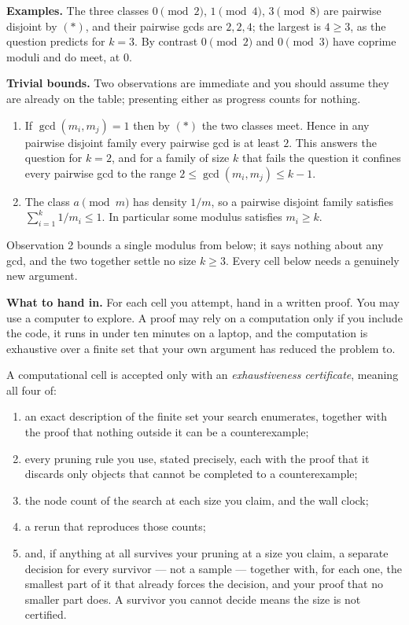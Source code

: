 \documentclass[11pt,a4paper]{article}
\providecommand{\tightlist}{\setlength{\itemsep}{0pt}\setlength{\parskip}{0pt}}
\begin{document}
\textbf{Examples.} The three classes \(0 \pmod 2\), \(1 \pmod 4\),
\(3 \pmod 8\) are pairwise disjoint by \((*)\), and their pairwise gcds
are \(2, 2, 4\); the largest is \(4 \ge 3\), as the question predicts
for \(k = 3\). By contrast \(0 \pmod 2\) and \(0 \pmod 3\) have coprime
moduli and do meet, at \(0\).

\textbf{Trivial bounds.} Two observations are immediate and you should
assume they are already on the table; presenting either as progress
counts for nothing.

\begin{enumerate}
\def\labelenumi{\arabic{enumi}.}
\tightlist
\item
  If \(\gcd(m_i, m_j) = 1\) then by \((*)\) the two classes meet. Hence
  in any pairwise disjoint family every pairwise gcd is at least \(2\).
  This answers the question for \(k = 2\), and for a family of size
  \(k\) that fails the question it confines every pairwise gcd to the
  range \(2 \le \gcd(m_i, m_j) \le k - 1\).
\item
  The class \(a \pmod m\) has density \(1/m\), so a pairwise disjoint
  family satisfies \(\sum_{i=1}^k 1/m_i \le 1\). In particular some
  modulus satisfies \(m_i \ge k\).
\end{enumerate}

Observation 2 bounds a single modulus from below; it says nothing about
any gcd, and the two together settle no size \(k \ge 3\). Every cell
below needs a genuinely new argument.

\textbf{What to hand in.} For each cell you attempt, hand in a written
proof. You may use a computer to explore. A proof may rely on a
computation only if you include the code, it runs in under ten minutes
on a laptop, and the computation is exhaustive over a finite set that
your own argument has reduced the problem to.

A computational cell is accepted only with an \emph{exhaustiveness
certificate}, meaning all four of:

\begin{enumerate}
\def\labelenumi{\arabic{enumi}.}
\tightlist
\item
  an exact description of the finite set your search enumerates,
  together with the proof that nothing outside it can be a
  counterexample;
\item
  every pruning rule you use, stated precisely, each with the proof that
  it discards only objects that cannot be completed to a counterexample;
\item
  the node count of the search at each size you claim, and the wall
  clock;
\item
  a rerun that reproduces those counts;
\item
  and, if anything at all survives your pruning at a size you claim, a
  separate decision for every survivor --- not a sample --- together
  with, for each one, the smallest part of it that already forces the
  decision, and your proof that no smaller part does. A survivor you
  cannot decide means the size is not certified.
\end{enumerate}
\end{document}
